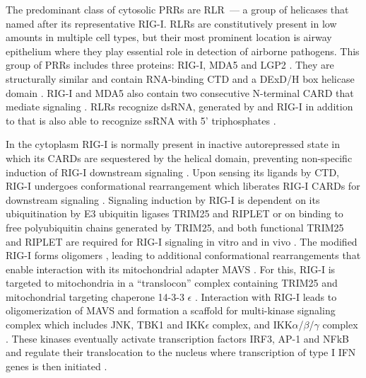 		 
		The predominant class of cytosolic PRRs are \gls{RLR}~--- a group of helicases that named after its representative \gls{RIG-I}.  \gls{RLR}s are constitutively present in low amounts in multiple cell types, but their most prominent location is airway epithelium \parencite{Bogefors2011} where they play essential role in detection of airborne pathogens. This group of \gls{PRR}s includes three proteins: \gls{RIG-I}, \gls{MDA5} and \gls{LGP2} \parencite{Kang2004, Yoneyama2004, Yoneyama2005}. They are structurally similar and contain RNA-binding \gls{CTD} and a DExD/H box helicase domain \parencite{Cui2008, Takahasi2009}. \gls{RIG-I} and \gls{MDA5} also contain two consecutive N-terminal \gls{CARD} that mediate signaling \parencite{Yoneyama2004, Kang2004}. \gls{RLR}s recognize dsRNA, generated by  and \gls{RIG-I} in addition to that is also able to recognize ssRNA with 5' triphosphates \parencite{Cui2008}. 
		
		In the cytoplasm \gls{RIG-I} is normally present in inactive autorepressed state in which its \gls{CARD}s are sequestered by the helical domain, preventing non-specific induction of \gls{RIG-I} downstream signaling \parencite{Kowalinski2011}. Upon sensing its ligands by \gls{CTD}, \gls{RIG-I} undergoes conformational rearrangement which liberates \gls{RIG-I} \gls{CARD}s for downstream signaling \parencite{Kowalinski2011}. Signaling induction by \gls{RIG-I} is  dependent on its ubiquitination by E3 ubiquitin ligases TRIM25 and RIPLET or on binding to free polyubiquitin chains generated by TRIM25, and both functional TRIM25 and RIPLET are required for \gls{RIG-I} signaling in vitro and in vivo \parencite{Gack2007, Oshiumi2010, Zeng2010}. The modified \gls{RIG-I} forms oligomers \parencite{Patel2013}, leading to additional conformational rearrangements that enable interaction with its  mitochondrial adapter \gls{MAVS} \parencite{Kawai2005, Seth2005}. For this, \gls{RIG-I} is targeted to mitochondria in a ``translocon'' complex containing TRIM25 and mitochondrial targeting chaperone 14-3-3 $\epsilon$ \parencite{Liu2012}. Interaction with \gls{RIG-I} leads to oligomerization of \gls{MAVS} and formation a scaffold for multi-kinase signaling complex which includes \gls{JNK}, \gls{TBK1} and \gls{IKK}$\epsilon$ complex, and \gls{IKK}$\alpha$/$\beta$/$\gamma$ complex \parencite{McWhirter2005}. These kinases eventually activate transcription factors IRF3, AP-1 and \gls{NFkB} and regulate their translocation to the nucleus where transcription of type I \gls{IFN} genes is then initiated \parencite{McWhirter2005}. 
		

